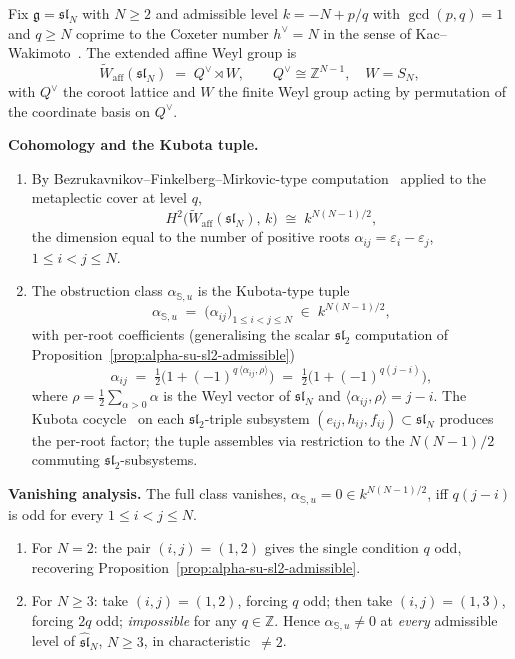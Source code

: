 \begin{proposition}
\label{prop:alpha-su-slN-admissible}
%
%
%
%
Fix $\mathfrak{g} = \mathfrak{sl}_N$ with $N\geq 2$ and admissible
level $k = -N + p/q$ with $\gcd(p,q)=1$ and $q\geq N$ coprime to the
Coxeter number $h^{\vee} = N$ in the sense of
Kac--Wakimoto~\cite{KacWakimoto88}. The extended affine Weyl group
is
\[
\widetilde{W}_{\mathrm{aff}}(\mathfrak{sl}_N) \;=\;
Q^{\vee}\rtimes W,\qquad
Q^{\vee} \cong \mathbb{Z}^{N-1},\quad W = S_N,
\]
with $Q^{\vee}$ the coroot lattice and $W$ the finite Weyl group
acting by permutation of the coordinate basis on $Q^{\vee}$.

\medskip
\noindent\textbf{Cohomology and the Kubota tuple.}
\begin{enumerate}[label=\textup{(\roman*)}]
\item By Bezrukavnikov--Finkelberg--Mirkovic-type
computation~\cite{Bezrukavnikov16,FinkelbergTsymbaliuk19} applied to
the metaplectic cover at level $q$,
\[
H^2\bigl(\widetilde{W}_{\mathrm{aff}}(\mathfrak{sl}_N),\,k\bigr)
\;\cong\; k^{N(N-1)/2},
\]
the dimension equal to the number of positive roots
$\alpha_{ij} = \varepsilon_i - \varepsilon_j$, $1\leq i<j\leq N$.
\item The obstruction class $\alpha_{\mathbb{S},u}$ is the
Kubota-type tuple
\[
\alpha_{\mathbb{S},u} \;=\; \bigl(\alpha_{ij}\bigr)_{1\leq i<j\leq N}
\;\in\; k^{N(N-1)/2},
\]
with per-root coefficients (generalising the scalar
$\mathfrak{sl}_2$ computation of
Proposition~\ref{prop:alpha-su-sl2-admissible})
\[
\alpha_{ij} \;=\; \tfrac{1}{2}
\bigl(1 + (-1)^{q\,\langle \alpha_{ij},\rho\rangle}\bigr)
\;=\; \tfrac{1}{2}\bigl(1 + (-1)^{q(j-i)}\bigr),
\]
where $\rho = \tfrac12\sum_{\alpha>0}\alpha$ is the Weyl vector of
$\mathfrak{sl}_N$ and $\langle\alpha_{ij},\rho\rangle = j-i$.
The Kubota cocycle~\cite{Kubota69} on each $\mathfrak{sl}_2$-triple
subsystem $(e_{ij},h_{ij},f_{ij})\subset\mathfrak{sl}_N$ produces
the per-root factor; the tuple assembles via restriction to the
$N(N-1)/2$ commuting $\mathfrak{sl}_2$-subsystems.
\end{enumerate}

\medskip
\noindent\textbf{Vanishing analysis.}
The full class vanishes,
$\alpha_{\mathbb{S},u} = 0 \in k^{N(N-1)/2}$, iff
$q(j-i)$ is odd for every $1\leq i<j\leq N$.
\begin{enumerate}[label=\textup{(\alph*)}]
\item For $N=2$: the pair $(i,j)=(1,2)$ gives the single
condition $q$ odd, recovering
Proposition~\ref{prop:alpha-su-sl2-admissible}.
\item For $N\geq 3$: take $(i,j)=(1,2)$, forcing $q$ odd; then
take $(i,j)=(1,3)$, forcing $2q$ odd; \emph{impossible} for
any $q\in\mathbb{Z}$. Hence $\alpha_{\mathbb{S},u}\neq 0$ at
\emph{every} admissible level of $\widehat{\mathfrak{sl}}_N$,
$N\geq 3$, in characteristic~$\neq 2$.
\end{enumerate}


\end{proposition}
